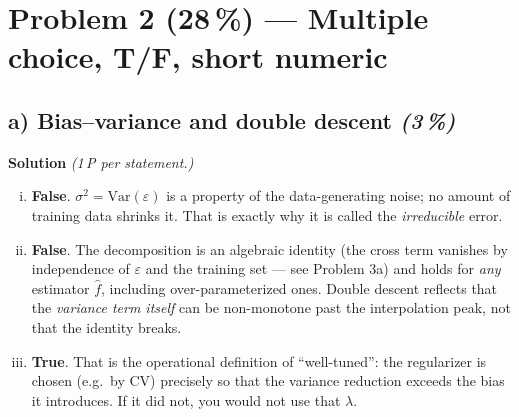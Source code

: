 \documentclass[11pt,a4paper]{article}
\newcommand{\points}[1]{\textbf{(#1\,\%)}}
\newcommand{\subpoints}[1]{\textit{(#1\,\%)}}
\newcommand{\sol}{\noindent\textbf{Solution}}
\begin{document}
\section*{Problem 2 \points{28} --- Multiple choice, T/F, short numeric}

\subsection*{a) Bias--variance and double descent \subpoints{3}}
\sol{} \emph{(1\,P per statement.)}
\begin{enumerate}[(i)]
  \item \textbf{False}. $\sigma^2 = \mathrm{Var}(\varepsilon)$ is a property of the data-generating
        noise; no amount of training data shrinks it. That is exactly why it is called the
        \emph{irreducible} error.
  \item \textbf{False}. The decomposition is an algebraic identity (the cross term vanishes by
        independence of $\varepsilon$ and the training set --- see Problem 3a) and holds for
        \emph{any} estimator $\hat f$, including over-parameterized ones. Double descent reflects
        that the \emph{variance term itself} can be non-monotone past the interpolation peak, not
        that the identity breaks.
  \item \textbf{True}. That is the operational definition of ``well-tuned'': the regularizer is
        chosen (e.g.\ by CV) precisely so that the variance reduction exceeds the bias it
        introduces. If it did not, you would not use that $\lambda$.
\end{enumerate}
\end{document}
